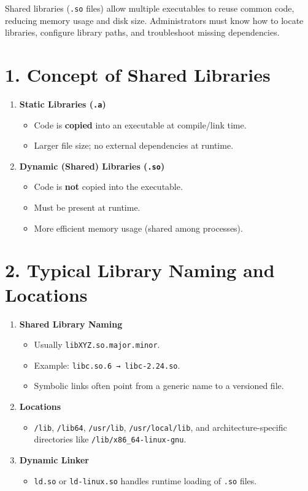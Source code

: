 \documentclass[a4paper]{report}
\begin{document}
Shared libraries (\texttt{.so} files) allow multiple executables to reuse common code, reducing memory usage and disk size. Administrators must know how to locate libraries, configure library paths, and troubleshoot missing dependencies.

\section*{1. Concept of Shared Libraries}

\begin{enumerate}
    \item \textbf{Static Libraries (\texttt{.a})}
    \begin{itemize}
        \item Code is \textbf{copied} into an executable at compile/link time.
        \item Larger file size; no external dependencies at runtime.
    \end{itemize}

    \item \textbf{Dynamic (Shared) Libraries (\texttt{.so})}
    \begin{itemize}
        \item Code is \textbf{not} copied into the executable.
        \item Must be present at runtime.
        \item More efficient memory usage (shared among processes).
    \end{itemize}
\end{enumerate}

\section*{2. Typical Library Naming and Locations}

\begin{enumerate}
    \item \textbf{Shared Library Naming}
    \begin{itemize}
        \item Usually \texttt{libXYZ.so.major.minor}.
        \item Example: \texttt{libc.so.6 → libc-2.24.so}.
        \item Symbolic links often point from a generic name to a versioned file.
    \end{itemize}

    \item \textbf{Locations}
    \begin{itemize}
        \item \texttt{/lib}, \texttt{/lib64}, \texttt{/usr/lib}, \texttt{/usr/local/lib}, and architecture-specific directories like \texttt{/lib/x86\_64-linux-gnu}.
    \end{itemize}

    \item \textbf{Dynamic Linker}
    \begin{itemize}
        \item \texttt{ld.so} or \texttt{ld-linux.so} handles runtime loading of \texttt{.so} files.
    \end{itemize}
\end{enumerate}
\end{document}
